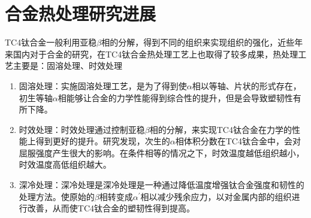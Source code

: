 %



\section{\ti 合金热处理研究进展}
TC4钛合金一般利用亚稳$  \beta$相的分解，得到不同的组织来实现组织的强化，近些年来国内对于\ti 合金的研究，在TC4钛合金热处理工艺上也取得了较多成果\cite{guokaiTC4taihejinrechuligongyideyanjiuxianzhuangjijinzhan2021}，热处理工艺主要是：固溶处理、时效处理

\begin{enumerate}
	\item 固溶处理：实施固溶处理工艺，是为了得到使$ \alpha $相以等轴、片状的形式存在，初生等轴$\alpha$相能够让合金的力学性能得到综合性的提升，但是会导致塑韧性有所下降\cite{gurong2002}。
	\item 时效处理：时效处理通过控制亚稳$ \beta $相的分解，来实现TC4钛合金在力学的性能上得到更好的提升。研究\cite{luyuanyuanShixiaochuliduiTC4taihejinweiguanzuzhihelixuexingnengdeyingxiang2019}发现，次生的$\alpha$相体积分数在TC4钛合金中，会对屈服强度产生很大的影响。在条件相等的情况之下，时效温度越低组织越小，时效温度高低组织越大。
	\item 深冷处理：深冷处理是深冷处理是一种通过降低温度增强钛合金强度和韧性的处理方法。使原始的$\beta$相转变成$\alpha^{\prime}$相以减少残余应力，以对金属内部的组织进行改善，从而使TC4钛合金的塑韧性得到提高。
\end{enumerate}


